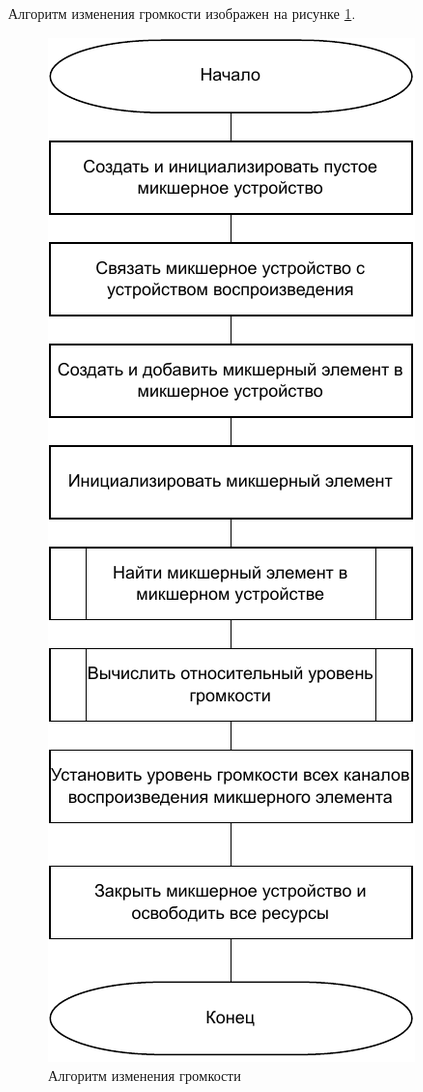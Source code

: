 Алгоритм изменения громкости изображен на рисунке \ref{fig:volume_controller}.
\begin{figure}[h!btp]
	\centering
	\includegraphics[scale = 1.3]{inc/diag/audio_controller.pdf}
	\caption{Алгоритм изменения громкости}
	\label{fig:volume_controller}	
\end{figure}

